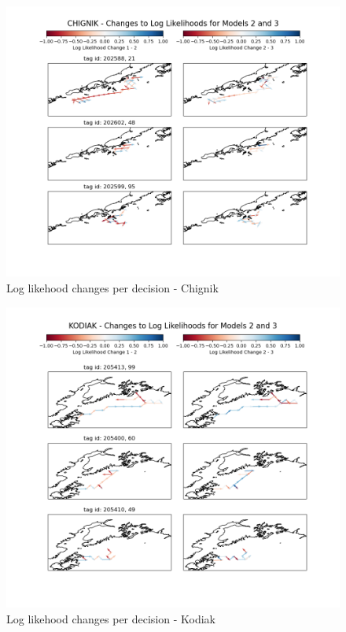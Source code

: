 \documentclass[11pt]{article}
\begin{document}
\begin{figure}[h!] 
	\centering
  \includegraphics[width=140mm]{figures/chignik_map.png}
  \caption{Log likehood changes per decision - Chignik}
  \label{fig:chignik_map}
\end{figure}

\begin{figure}[h!] 
	\centering
  \includegraphics[width=140mm]{figures/kodiak_map.png}
  \caption{Log likehood changes per decision - Kodiak}
  \label{fig:kodiak_map}
\end{figure}
\end{document}
